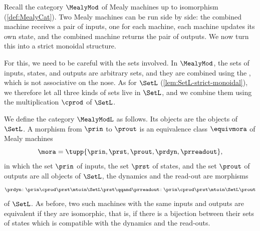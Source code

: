 \begin{example}
    \label{exa:MealyModL-strict-monoidal}
    Recall the category $\MealyMod$ of Mealy machines up to isomorphism (\cref{def:MealyCat}).
    Two Mealy machines can be run side by side: the combined machine receives a pair of inputs, one for each machine, each machine updates its own state, and the combined machine returns the pair of outputs.
    We now turn this into a strict monoidal structure.

    For this, we need to be careful with the sets involved.
    In $\MealyMod$, the sets of inputs, states, and outputs are arbitrary sets, and they are combined using the , which is not associative on the nose.
    As for $\SetL$ (\cref{lem:SetL-strict-monoidal}), we therefore let all three kinds of sets live in $\SetL$, and we combine them using the multiplication $\cprod$ of $\SetL$.

    We define the category $\MealyModL$ as follows.
    Its objects are the objects of $\SetL$.
    A morphism from $\prin$ to $\prout$ is an equivalence class $\equivmora$ of Mealy machines
    \begin{equation}
        \mora = \tupp{\prin, \prst, \prout, \prdyn, \prreadout},
    \end{equation}
    in which the set $\prin$ of inputs, the set $\prst$ of states, and the set $\prout$ of outputs are all objects of $\SetL$, the dynamics and the read-out are morphisms
    \begin{equation}
        \prdyn \colon \prin \cprod \prst \mtoin\SetL \prst
        \qqand
        \prreadout \colon \prin \cprod \prst \mtoin\SetL \prout
    \end{equation}
    of $\SetL$.
    As before, two such machines with the same inputs and outputs are equivalent if they are isomorphic, that is, if there is a bijection between their sets of states which is compatible with the dynamics and the read-outs.


\end{example}
